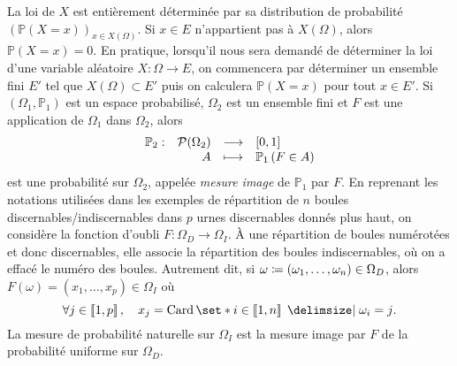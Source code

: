 \documentclass{magnolia}
\begin{document}
\begin{remarques}
\remarque La loi de $X$ est entièrement déterminée par
  sa distribution de probabilité $(\mathbb{P}(X=x))_{x\in X(\Omega)}$.
\remarque Si $x\in E$ n'appartient pas à $X(\Omega)$, alors $\mathbb{P}(X=x)=0$.
\remarque 
  En pratique, lorsqu'il nous sera demandé de déterminer la loi d'une variable aléatoire
  $X:\Omega\to E$, on commencera par déterminer un ensemble fini $E'$ tel que $X(\Omega)\subset E'$
  puis on calculera $\mathbb{P}(X=x)$ pour tout $x\in E'$.
\remarque Si $(\Omega_1,\mathbb{P}_1)$ est un espace probabilisé, $\Omega_2$ est un ensemble fini et
  $F$ est une application de $\Omega_1$ dans $\Omega_2$, alors
  \[\begin{array}[t]{lrcl} \displaystyle{\mathbb{P}_2} : & \displaystyle{\mathcal{P}(\Omega_2)} & \longrightarrow & \displaystyle{\left[0,1\right]} \\ & \displaystyle{A} & \longmapsto & \displaystyle{\mathbb{P}_1\left(F\in A\right)} \end{array}\] 
  est une probabilité sur $\Omega_2$, appelée \emph{mesure image} de $\mathbb{P}_1$ par $F$.
\remarque
  En reprenant les notations utilisées dans les exemples de répartition de $n$ boules  
  discernables/indiscernables
  dans $p$ urnes discernables donnés plus haut, 
  on considère la fonction d'oubli $F:\Omega_D\to\Omega_I$. À une répartition de boules numérotées et donc discernables, elle associe
  la répartition
  des boules indiscernables, où on a effacé le numéro des boules. Autrement dit, si
  $\omega\coloneqq(\omega_1,\ldots,\omega_n)\in\Omega_D$, alors
  $F(\omega)=(x_1,\ldots,x_p)\in\Omega_I$ où
  \[\forall j\in\intere{1}{p}\qsep x_j=\card\enstq{i\in\intere{1}{n}}{\omega_i=j}.\]
La mesure de probabilité naturelle sur $\Omega_I$ est la mesure image par $F$ de la probabilité uniforme sur
  $\Omega_D$.
\end{remarques}
\end{document}
